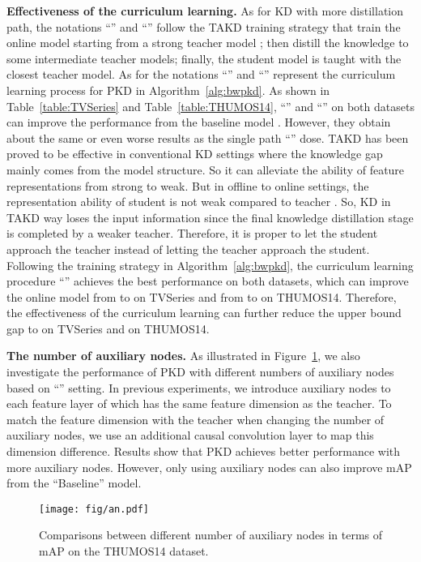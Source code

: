\documentclass[final]{cvpr}
\begin{document}
\noindent \textbf{Effectiveness of the curriculum learning.} As for KD with more distillation path, the notations ``'' and ``'' follow the TAKD \cite{mirzadeh2020improved} training strategy that train the online model  starting from a strong teacher model ; then distill the knowledge to some intermediate teacher models; finally, the student model  is taught with the closest teacher model. As for the notations ``'' and ``'' represent the curriculum learning process for PKD in Algorithm~\ref{alg:bwpkd}. 
As shown in Table~\ref{table:TVSeries} and Table~\ref{table:THUMOS14}, ``'' and ``'' on both datasets can improve the performance from the baseline model . However, they obtain about the same or even worse results as the single path ``'' dose. TAKD has been proved to be effective in conventional KD settings where the knowledge gap mainly comes from the model structure. So it can alleviate the ability of feature representations from strong to weak. But in offline to online settings, the representation ability of student  is not weak compared to teacher . So, KD in TAKD way loses the input information since the final knowledge distillation stage is completed by a weaker teacher. Therefore, it is proper to let the student approach the teacher instead of letting the teacher approach the student. Following the training strategy in Algorithm~\ref{alg:bwpkd}, the curriculum learning procedure ``'' achieves the best performance on both datasets, which can improve the online model  from  to  on TVSeries and from  to  on THUMOS14. Therefore, the effectiveness of the curriculum learning can further reduce the upper bound gap to  on TVSeries and  on THUMOS14.


\noindent \textbf{The number of auxiliary nodes.}  As illustrated in Figure~\ref{fig:an}, we also investigate the performance of PKD with different numbers of auxiliary nodes based on ``'' setting. In previous experiments, we introduce auxiliary nodes to each feature layer of  which has the same feature dimension as the teacher. To match the feature dimension with the teacher when changing the number of auxiliary nodes, we use an additional causal convolution layer to map this dimension difference. Results show that PKD achieves better performance with more auxiliary nodes. However, only using  auxiliary nodes can also improve  mAP from the ``Baseline'' model.

\begin{figure}[t]
\begin{center}
  \texttt{[image: fig/an.pdf]}
\end{center}
\caption{Comparisons between different number of auxiliary nodes in terms of mAP on the THUMOS14 dataset.
}
\label{fig:an}
\end{figure}
\end{document}
